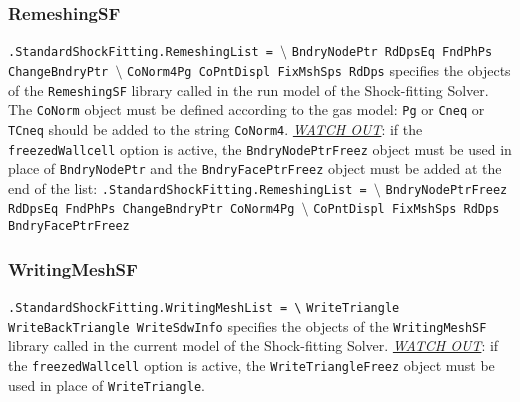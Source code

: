 \documentclass[11pt,a4paper,oneside]{article}
\begin{document}
\subsubsection{RemeshingSF}

\hspace*{1cm} \texttt{.StandardShockFitting.RemeshingList = $\setminus$}
\newline
\hspace*{1.3cm} \texttt{BndryNodePtr RdDpsEq FndPhPs ChangeBndryPtr $\setminus$}
\newline
\hspace*{1.3cm} \texttt{CoNorm4Pg CoPntDispl FixMshSps RdDps}
\newline
\newline
specifies the objects of the \texttt{RemeshingSF} library called in the run model of the Shock-fitting Solver.
The \texttt{CoNorm} object must be defined according to the gas model: \texttt{Pg} or \texttt{Cneq} or \texttt{TCneq} should be added to the string \texttt{CoNorm4}.
\newline
\newline
\underline{\emph{WATCH OUT}}: if the \texttt{freezedWallcell} option is active, the \texttt{BndryNodePtrFreez} object must be used in place of \texttt{BndryNodePtr} and the \texttt{BndryFacePtrFreez} object must be added at the end of the list:
\newline
\newline
\hspace*{1cm} \texttt{.StandardShockFitting.RemeshingList = $\setminus$}
\newline
\hspace*{1.3cm} \texttt{BndryNodePtrFreez RdDpsEq FndPhPs ChangeBndryPtr CoNorm4Pg $\setminus$}
\newline
\hspace*{1.3cm} \texttt{CoPntDispl FixMshSps RdDps BndryFacePtrFreez}

\subsubsection{WritingMeshSF}

\hspace*{1cm} \texttt{.StandardShockFitting.WritingMeshList = \textbackslash{}}
\newline
\hspace*{1.3cm} \texttt{WriteTriangle WriteBackTriangle WriteSdwInfo}
\newline
\newline
specifies the objects of the \texttt{WritingMeshSF} library called in the current model of the Shock-fitting Solver.
\newline
\newline
\underline{\emph{WATCH OUT}}: if the \texttt{freezedWallcell} option is active, the \texttt{WriteTriangleFreez} object must be used in place of \texttt{WriteTriangle}.
\end{document}
